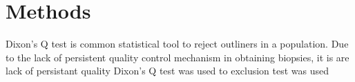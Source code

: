 \chapter{Methods}

Dixon's Q test is common statistical tool to reject outliners in a population. Due to the lack of persistent quality control mechanism in obtaining biopsies, it is  are lack of persistant quality Dixon's Q test was used to   exclusion test was used 